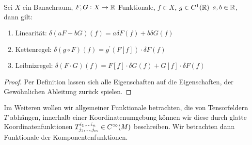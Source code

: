 \begin{lemma}
Sei $X$ ein Banachraum, $F,G:X\to \mathbb{R}$ Funktionale,  $f\in X $, $g\in
C^1(\mathbb{R})$ $a,b\in\mathbb{R}$, dann gilt:
\begin{enumerate}
  \item Linearität: $\delta (aF+bG)(f)=a\delta F (f)+b\delta G(f)$
  \item Kettenregel: $\delta (g\circ F)(f)=g^\prime(F[f])\cdot \delta F(f)$
  \item Leibnizregel: $\delta (F\cdot G)(f)=F[f]\cdot \delta G(f)+G[f]\cdot
  \delta F(f)$
\end{enumerate}
\end{lemma}
\begin{proof}
Per Definition lassen sich alle Eigenschaften auf die Eigenschaften, der
Gewöhnlichen Ableitung zurück spielen.
\end{proof}
Im Weiteren wollen wir allgemeiner Funktionale betrachten, die von Tensorfeldern
$T$ abhängen, innerhalb einer Koordinatenumgebung können wir diese durch
glatte Koordinatenfunktionen $\tensor*{T}{^{i_1,\dots
i_n}_{j_1,\dots,j_m}}\in C^\infty(M)$ beschreiben. Wir betrachten dann
Funktionale der Komponentenfunktionen.
